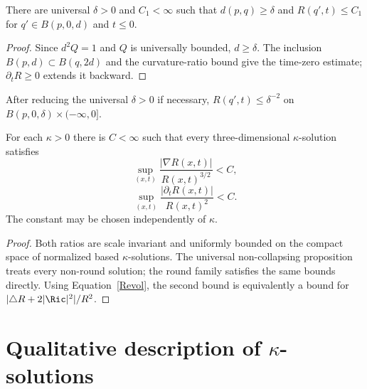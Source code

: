 \begin{claim}\label{claim:basepoint-neighborhood-curvature-bound}
\label{bdnearxk}
There are universal $\delta>0$ and $C_1<\infty$ such that
$d(p,q)\geq\delta$ and $R(q',t)\leq C_1$ for
$q'\in B(p,0,d)$ and $t\leq0$.
\end{claim}
\begin{proof}
\sketch Since $d^2Q=1$ and $Q$ is universally bounded,
$d\geq\delta$. The inclusion $B(p,d)\subset B(q,2d)$ and the
curvature-ratio bound give the time-zero estimate; $\partial_tR\geq0$
extends it backward.
\end{proof}

\begin{corollary}\label{cor:curvature-bound-fixed-ball}
\label{rho}
After reducing the universal $\delta>0$ if necessary,
$R(q',t)\leq\delta^{-2}$ on
$B(p,0,\delta)\times(-\infty,0]$.
\end{corollary}

\begin{corollary}\label{cor:curvature-derivative-bounds-universal}
\label{derivcor}
For each $\kappa>0$ there is $C<\infty$ such that every
three-dimensional $\kappa$-solution satisfies
\begin{equation}\label{gradest}
 \sup_{(x,t)}\frac{|\nabla R(x,t)|}{R(x,t)^{3/2}}<C,
\end{equation}
\begin{equation}\label{timeest}
 \sup_{(x,t)}\frac{|\partial_tR(x,t)|}{R(x,t)^2}<C.
\end{equation}
The constant may be chosen independently of $\kappa$.
\end{corollary}
\begin{proof}
\sketch
{}
Both ratios are scale invariant and uniformly bounded on the compact
space of normalized based $\kappa$-solutions. The universal
non-collapsing proposition treats every non-round solution; the
round family satisfies the same bounds directly. Using
Equation~\ref{Revol}, the second bound is equivalently a bound for
$|\triangle R+2|\Ric|^2|/R^2$.
\end{proof}

\section{Qualitative description of $\kappa$-solutions}

